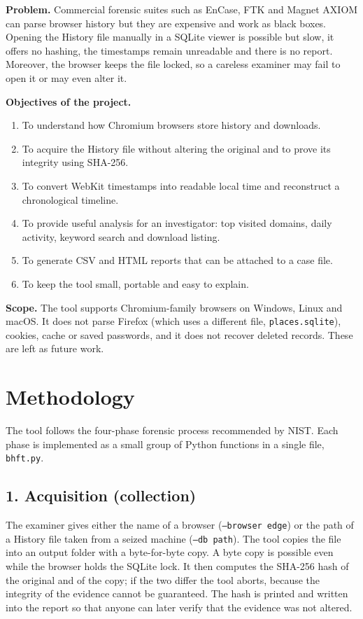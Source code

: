 \documentclass[12pt,a4paper]{article}
\begin{document}
\textbf{Problem.} Commercial forensic suites such as EnCase, FTK and Magnet AXIOM can parse browser history but they are expensive and work as black boxes. Opening the History file manually in a SQLite viewer is possible but slow, it offers no hashing, the timestamps remain unreadable and there is no report. Moreover, the browser keeps the file locked, so a careless examiner may fail to open it or may even alter it.

\textbf{Objectives of the project.}
\begin{enumerate}[nosep]
  \item To understand how Chromium browsers store history and downloads.
  \item To acquire the History file without altering the original and to prove its integrity using SHA-256.
  \item To convert WebKit timestamps into readable local time and reconstruct a chronological timeline.
  \item To provide useful analysis for an investigator: top visited domains, daily activity, keyword search and download listing.
  \item To generate CSV and HTML reports that can be attached to a case file.
  \item To keep the tool small, portable and easy to explain.
\end{enumerate}

\textbf{Scope.} The tool supports Chromium-family browsers on Windows, Linux and macOS. It does not parse Firefox (which uses a different file, \texttt{places.sqlite}), cookies, cache or saved passwords, and it does not recover deleted records. These are left as future work.

\newpage
\section*{Methodology}\label{sec:method}
The tool follows the four-phase forensic process recommended by NIST. Each phase is implemented as a small group of Python functions in a single file, \texttt{bhft.py}.

\subsection*{1. Acquisition (collection)}
The examiner gives either the name of a browser (\texttt{--browser edge}) or the path of a History file taken from a seized machine (\texttt{--db path}). The tool copies the file into an output folder with a byte-for-byte copy. A byte copy is possible even while the browser holds the SQLite lock. It then computes the SHA-256 hash of the original and of the copy; if the two differ the tool aborts, because the integrity of the evidence cannot be guaranteed. The hash is printed and written into the report so that anyone can later verify that the evidence was not altered.
\end{document}
